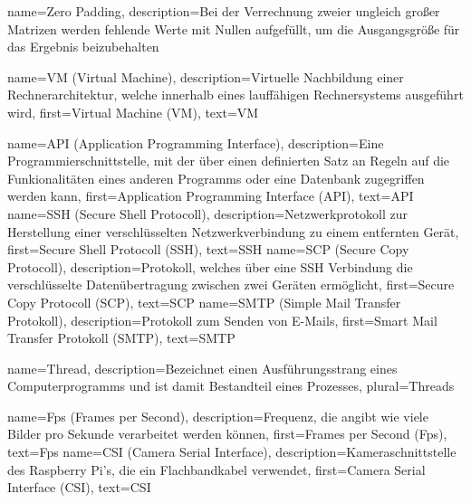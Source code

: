 {
    name={Zero Padding},
    description={Bei der Verrechnung zweier ungleich 
    großer Matrizen werden fehlende Werte mit Nullen 
    aufgefüllt, um die Ausgangsgröße für das 
    Ergebnis beizubehalten}
}



{
    name={VM (Virtual Machine)},
    description={Virtuelle Nachbildung einer Rechnerarchitektur, 
    welche innerhalb eines lauffähigen Rechnersystems
    ausgeführt wird},
    first={Virtual Machine (VM)},
    text={VM}
}

{
    name={API (Application Programming Interface)},
    description={Eine Programmierschnittstelle, 
    mit der über einen definierten Satz an Regeln 
    auf die Funkionalitäten eines anderen Programms 
    oder eine Datenbank zugegriffen werden kann},
    first={Application Programming Interface (API)},
    text={API}
}
{
    name={SSH (Secure Shell Protocoll)},
    description={Netzwerkprotokoll zur Herstellung
    einer verschlüsselten Netzwerkverbindung
    zu einem entfernten Gerät},
    first={Secure Shell Protocoll (SSH)},
    text={SSH}
}
{
    name={SCP (Secure Copy Protocoll)},
    description={Protokoll, welches über 
    eine SSH Verbindung die verschlüsselte
    Datenübertragung zwischen zwei Geräten 
    ermöglicht},
    first={Secure Copy Protocoll (SCP)},
    text={SCP}
}
{
    name={SMTP (Simple Mail Transfer Protokoll)},
    description={Protokoll zum Senden von E-Mails},
    first={Smart Mail Transfer Protokoll (SMTP)},
    text={SMTP}
}

{
    name={Thread},
    description={Bezeichnet einen Ausführungsstrang 
    eines Computerprogramms und ist damit Bestandteil 
    eines Prozesses},
    plural={Threads}
}

{
    name={Fps (Frames per Second)},
    description={Frequenz, die angibt 
    wie viele Bilder pro Sekunde verarbeitet werden können},
    first={Frames per Second (Fps)},
    text={Fps}
}
{
    name={CSI (Camera Serial Interface)},
    description={Kameraschnittstelle des Raspberry Pi's,
    die ein Flachbandkabel verwendet},
    first={Camera Serial Interface (CSI)},
    text={CSI}
}


